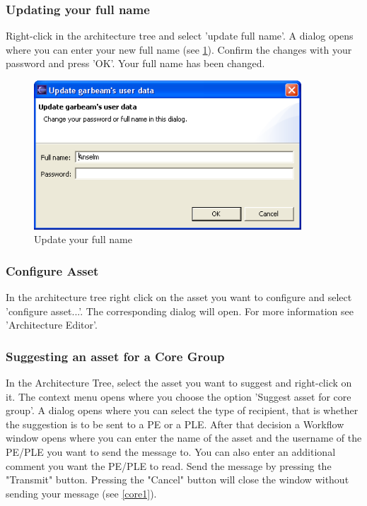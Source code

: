 \subsubsection{Updating your full name}
Right-click in the architecture tree and select 'update full name'. A dialog opens where you can
enter your new full name (see \ref{fullname}). Confirm the changes with your password and press 'OK'. Your full name has been changed.

\begin{figure}[h!]
\begin{center}
\includegraphics[width=10cm]{updatefullname.png}
   \caption{Update your full name}
\label{fullname}
\end{center}
\end{figure}\par

\subsubsection{Configure Asset}
In the architecture tree right click on the asset you want to configure and select
'configure asset...'. The corresponding dialog will open. For more information see
'Architecture Editor'.

\subsubsection{Suggesting an asset for a Core Group}

In the Architecture Tree, select the asset you want to suggest and right-click on it. The context menu opens where
 you choose the option 'Suggest asset for core group'. A dialog opens where
 you can select the type of recipient, that is whether the suggestion is to be sent to a PE or a PLE. After
 that decision a Workflow
window opens where you can enter the name of the asset and the username of the
PE/PLE you want to send the message to. You can also enter an additional comment you want 
the PE/PLE to read. Send the message by pressing the "Transmit" 
button. Pressing the "Cancel" button will close the window without sending 
your message (see \ref{core1}).

